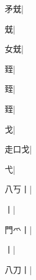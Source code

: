 \begin{multicols}{2}
{{\cjk{}{\cnsym{}　}矛兓}\mktsJzrVerticalBar{}{\cjk{}{\cnsym{}　}{\cnsym{}　}{\cnsym{}　}}|{}\par
{兓}\mktsJzrVerticalBar{}{\cjk{}{\cnsym{}　}{\cnsym{}　}{\cnsym{}　}}|{}\par
{\cjk{}{\cnsym{}　}女兓}\mktsJzrVerticalBar{}{\cjk{}{\cnsym{}　}{\cnsym{}　}{\cnsym{}　}}|{}\par
{\cjk{}{\cnsym{}　}{\cnsym{}　}臸}\mktsJzrVerticalBar{}{\cjk{}{\cnsym{}　}{\cnsym{}　}{\cnsym{}　}}|{}\par
{臸}\mktsJzrVerticalBar{}{\cjk{}{\cnsym{}　}{\cnsym{}　}{\cnsym{}　}}|{}\par
{臸}\mktsJzrVerticalBar{}{\cjk{}{\cnsym{}　}{\cnsym{}　}{\cnsym{}　}}|{}\par
{\cjk{}{\cnsym{}　}{\cnsym{}　}戈}\mktsJzrVerticalBar{}{\cjk{}{\cnsym{}　}{\cnsym{}　}{\cnsym{}　}}|{}\par
{\cjk{}走口戈}\mktsJzrVerticalBar{}{\cjk{}{\cnsym{}　}{\cnsym{}　}{\cnsym{}　}}|{}\par
{\cjk{}{\cnsym{}　}{\cnsym{}　}弋}\mktsJzrVerticalBar{}{\cjk{}{\cnsym{}　}{\cnsym{}　}{\cnsym{}　}}|{}\par
{\cjk{}八丂丨}|{}\par
{丨}|{}\par
{\cjk{}門{爫}丨}\mktsJzrVerticalBar{}{\cjk{}{\cnsym{}　}{\cnsym{}　}{\cnsym{}　}}|{}\par
{丨}\mktsJzrVerticalBar{}{\cjk{}{\cnsym{}　}{\cnsym{}　}{\cnsym{}　}}|{}\par
{\cjk{}八刀丨}|{}\par
}
\end{multicols}
